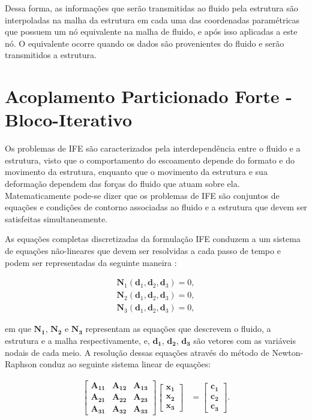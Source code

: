 \documentclass[tese_patricia]{subfiles}
\begin{document}
Dessa forma, as informações que serão transmitidas ao fluido pela estrutura são interpoladas na malha da estrutura em cada uma das coordenadas paramétricas que possuem um nó equivalente na malha de fluido, e após isso aplicadas a este nó. O equivalente ocorre quando os dados são provenientes do fluido e serão transmitidos a estrutura.


\section{Acoplamento Particionado Forte - Bloco-Iterativo}

Os problemas de IFE são caracterizados pela interdependência entre o fluido e a estrutura, visto que o comportamento do escoamento depende do formato e do movimento da estrutura, enquanto que o movimento da estrutura e sua deformação dependem das forças do fluido que atuam sobre ela. Matematicamente pode-se dizer que os problemas de IFE são conjuntos de equações e condições de contorno associadas ao fluido e a estrutura que devem ser satisfeitas simultaneamente.

As equações completas discretizadas da formulação IFE conduzem a um sistema de equações não-lineares que devem ser resolvidas a cada passo de tempo e podem ser representadas da seguinte maneira \cite{BazilevsTT:2013}:

\begin{align}
	\mathbf{N}_{1}\left(\mathbf{d}_{1},\mathbf{d}_{2},\mathbf{d}_{3}\right) = 0, \label{eq:N1}\\ 
	\mathbf{N}_{2}\left(\mathbf{d}_{1},\mathbf{d}_{2},\mathbf{d}_{3}\right) = 0,\label{eq:N2}\\
	\mathbf{N}_{3}\left(\mathbf{d}_{1},\mathbf{d}_{2},\mathbf{d}_{3}\right) = 0 \label{eq:N3},
\end{align}

\noindent em que $\mathbf{{N}_{1}}$, $\mathbf{{N}_{2}}$ e $\mathbf{{N}_{3}}$ representam as equações que descrevem o fluido, a estrutura e a malha respectivamente, e, $\mathbf{{d}_{1}}$, $\mathbf{{d}_{2}}$, $\mathbf{{d}_{3}}$ são vetores com as variáveis nodais de cada meio. 
A resolução dessas equações através do método de Newton-Raphson conduz ao seguinte sistema linear de equações:

\begin{align}
	\begin{bmatrix}
		\mathbf{A_{11}} & \mathbf{A_{12}} & \mathbf{A_{13}} \\
		\mathbf{A_{21}} & \mathbf{A_{22}} & \mathbf{A_{23}} \\
		\mathbf{A_{31}} & \mathbf{A_{32}} & \mathbf{A_{33}} 
	\end{bmatrix}
	\begin{bmatrix}
		\mathbf{x_{1}} \\
		\mathbf{x_{2}} \\
		\mathbf{x_{3}}
	\end{bmatrix}
	&=
	\begin{bmatrix}
		\mathbf{c_{1}} \\
		\mathbf{c_{2}} \\
		\mathbf{c_{3}}
	\end{bmatrix}.
	\label{eq:SistLinear}
\end{align}	
\end{document}
